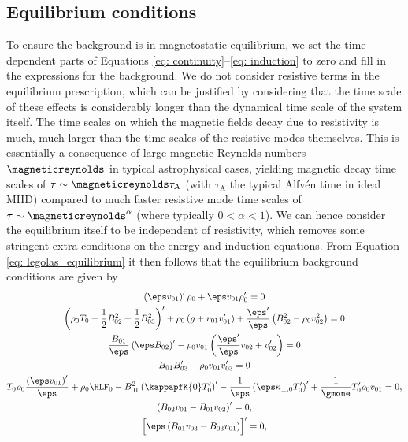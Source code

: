 \subsection{Equilibrium conditions} \label{ss: equilibrium conditions}
To ensure the background is in magnetostatic equilibrium, we set the time-dependent parts of Equations \eqref{eq: continuity}--\eqref{eq: induction} to zero and fill in the expressions for the background. We do not consider resistive terms in the equilibrium prescription, which can be justified by considering that the time scale of these effects is considerably longer than the dynamical time scale of the system itself. The time scales on which the magnetic fields decay due to resistivity is much, much larger than the time scales of the resistive modes themselves. This is essentially a consequence of large magnetic Reynolds numbers $\magneticreynolds$ in typical astrophysical cases, yielding magnetic decay time scales of $\tau \sim \magneticreynolds \tau_\text{A}$ (with $\tau_\text{A}$ the typical Alfv\'en time in ideal MHD) compared to much faster resistive mode time scales of $\tau \sim \magneticreynolds^\alpha$ (where typically $0 < \alpha < 1$). We can hence consider the equilibrium itself to be independent of resistivity, which removes some stringent extra conditions on the energy and induction equations. From Equation \eqref{eq: legolas_equilibrium} it then follows that the equilibrium background conditions are given by
\begingroup
\allowdisplaybreaks
\begin{gather}
  \left(\eps v_{01}\right)'\rho_0 + \eps v_{01}\rho_0' = 0 \\
  \left(\rho_0 T_0 + \frac{1}{2}B_{02}^2 + \frac{1}{2}B_{03}^2\right)'
    + \rho_0\left(g + v_{01}v_{01}'\right)
    + \frac{\eps'}{\eps}\left(B_{02}^2
    - \rho_0 v_{02}^2\right) = 0 \\
  \frac{B_{01}}{\eps}\left(\eps B_{02}\right)' - \rho_0 v_{01}\left(\frac{\eps'}{\eps}v_{02} + v_{02}'\right) = 0 \\
  B_{01}B_{03}' - \rho_0 v_{01}v_{03}' = 0 \\
  T_0 \rho_0 \frac{\left(\eps v_{01}\right)'}{\eps}
    + \rho_0 \HLF_0
    - B_{01}^2\left(\kappapfK{0} T_0'\right)'
    - \frac{1}{\eps}\left(\eps \kappa_{\perp, 0} T_0'\right)'
    + \frac{1}{\gmone}T_0'\rho_0 v_{01} = 0, \label{eq: general_thermal_equilibrium} \\
  \left(B_{02}v_{01} - B_{01}v_{02}\right)' = 0, \\
  \Bigl[\eps \left(B_{01}v_{03} - B_{03}v_{01}\right)\Bigr]' = 0,
\end{gather}
